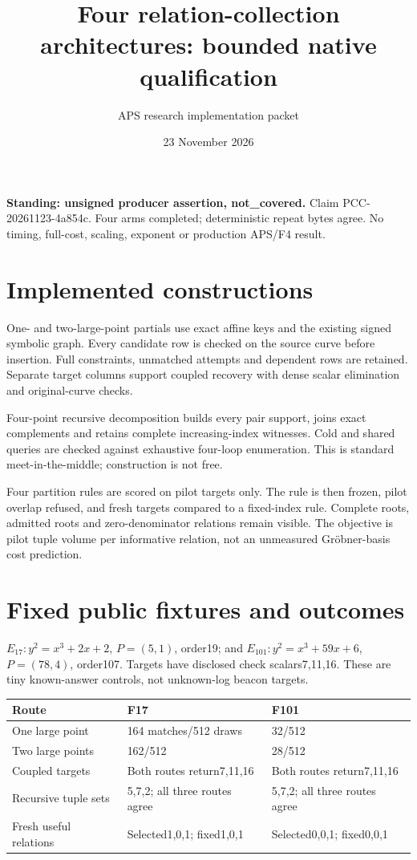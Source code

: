 \documentclass[10pt]{article}
\title{Four relation-collection architectures: bounded native qualification}
\author{APS research implementation packet}
\date{23 November 2026}
\begin{document}
\maketitle
\noindent\textbf{Standing: unsigned producer assertion, not\_covered.}
Claim PCC-20261123-4a854c. Four arms completed; deterministic repeat bytes
agree. No timing, full-cost, scaling, exponent or production APS/F4 result.

\section*{Implemented constructions}
One- and two-large-point partials use exact affine keys and the existing
signed symbolic graph. Every candidate row is checked on the source curve
before insertion. Full constraints, unmatched attempts and dependent rows
are retained. Separate target columns support coupled recovery with dense
scalar elimination and original-curve checks.

Four-point recursive decomposition builds every pair support, joins exact
complements and retains complete increasing-index witnesses. Cold and shared
queries are checked against exhaustive four-loop enumeration. This is standard
meet-in-the-middle; construction is not free.

Four partition rules are scored on pilot targets only. The rule is then frozen,
pilot overlap refused, and fresh targets compared to a fixed-index rule.
Complete roots, admitted roots and zero-denominator relations remain visible.
The objective is pilot tuple volume per informative relation, not an unmeasured
Gr\"obner-basis cost prediction.

\section*{Fixed public fixtures and outcomes}
$E_{17}:y^2=x^3+2x+2$, $P=(5,1)$, order19; and
$E_{101}:y^2=x^3+59x+6$, $P=(78,4)$, order107.
Targets have disclosed check scalars7,11,16. These are tiny known-answer
controls, not unknown-log beacon targets.

\begin{center}\begin{tabularx}{\linewidth}{lXX}\toprule
Route & F17 & F101\\\midrule
One large point & 164 matches/512 draws &32/512\\
Two large points &162/512 &28/512\\
Coupled targets & Both routes return7,11,16 &Both routes return7,11,16\\
Recursive tuple sets &5,7,2; all three routes agree &5,7,2; all three routes agree\\
Fresh useful relations &Selected1,0,1; fixed1,0,1 &Selected0,0,1; fixed0,0,1\\\bottomrule
\end{tabularx}\end{center}
\end{document}
